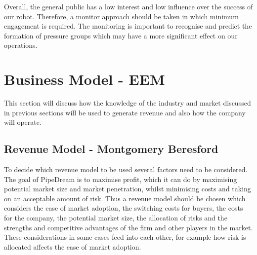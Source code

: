 \documentclass[11pt]{article}		%
\begin{document}
	        Overall, the general public has a low interest and low influence over the success of our robot. Therefore, a monitor approach should be taken in which minimum engagement is required. The monitoring is important to recognise and predict the formation of pressure groups which may have a more significant effect on our operations. 
        	

	\section{Business Model - EEM}
	        
    This section will discuss how the knowledge of the industry and market discussed in previous sections will be used to generate revenue and also how the company will operate.
    
		\subsection[Revenue Model]{Revenue Model - Montgomery Beresford}
        	  To decide which revenue model to be used several factors need to be considered. The goal of PipeDream is to maximise profit, which it can do by maximising potential market size and market penetration, whilst minimising costs and taking on an acceptable amount of risk. Thus a revenue model should be chosen which considers the ease of market adoption, the switching costs for buyers, the costs for the company, the potential market size, the allocation of risks and the strengths and competitive advantages of the firm and other players in the market. These considerations in some cases feed into each other, for example how risk is allocated affects the ease of market adoption.
        	  
\end{document}
